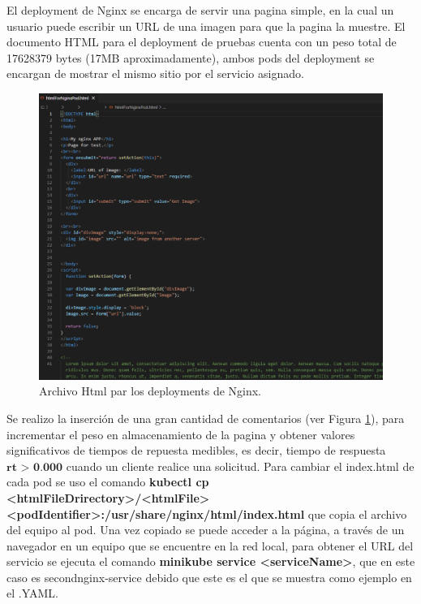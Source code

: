 \par El deployment de Nginx se encarga de servir una pagina simple, en la cual un usuario puede escribir un URL de una imagen para que la pagina la muestre. El documento HTML para el deployment de pruebas cuenta con un peso total de 17628379 bytes (17MB aproximadamente), ambos pods del deployment se encargan de mostrar el mismo sitio por el servicio asignado.\\

\begin{figure}[htpb!]
	\centering
	\includegraphics[width=0.95\columnwidth]{images/captures/podnginx/html01.PNG}
	\caption{Archivo Html par los deployments de Nginx.}
	\label{fig:html01}
\end{figure}

\par Se realizo la inserción de una gran cantidad de comentarios (ver Figura \ref{fig:html01}), para incrementar el peso en almacenamiento de la pagina y obtener valores significativos de tiempos de repuesta medibles, es decir, tiempo de respuesta $\textbf{rt > 0.000}$ cuando un cliente realice una solicitud. Para cambiar el index.html de cada pod se uso el comando \textbf{kubectl cp <htmlFileDrirectory>/<htmlFile> <podIdentifier>:/usr/share/nginx/html/index.html} que copia el archivo del equipo al pod. Una vez copiado se puede acceder a la p\'agina, a través de un navegador en un equipo que se encuentre en la red local, para obtener el URL del servicio se ejecuta el comando \textbf{minikube service <serviceName>}, que en este caso es secondnginx-service debido que este es el que se muestra como ejemplo en el .YAML.\\

